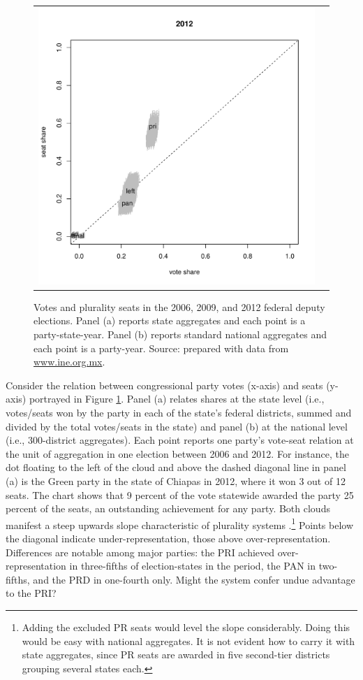 \documentclass[letter,12pt]{article}
\begin{document}
\begin{figure}
\begin{center}
\begin{tabular}{cc}
    \includegraphics[width=.48\columnwidth]{vs2012.pdf} \\
\end{tabular}
\caption{Votes and plurality seats in the 2006, 2009, and 2012 federal deputy elections. Panel (a) reports state aggregates and each point is a party-state-year. Panel (b) reports standard national aggregates and each point is a party-year. Source: prepared with data from \url{www.ine.org.mx}.}\label{F:seatsVotes}
\end{center}
\end{figure}

Consider the relation between congressional party votes (x-axis) and seats (y-axis) portrayed in Figure \ref{F:seatsVotes}. Panel (a) relates shares at the state level (i.e., votes/seats won by the party in each of the state's federal districts, summed and divided by the total votes/seats in the state) and panel (b) at the national level (i.e., 300-district aggregates). Each point reports one party's vote-seat relation at the unit of aggregation in one election between 2006 and 2012. For instance, the dot floating to the left of the cloud and above the dashed diagonal line in panel (a) is the Green party in the state of Chiapas in 2012, where it won 3 out of 12 seats. The chart shows that 9 percent of the vote statewide awarded the party 25 percent of the seats, an outstanding achievement for any party. Both clouds manifest a steep upwards slope characteristic of plurality systems \citep{taagepera.CubeLaw.1973}.\footnote{Adding the excluded PR seats would level the slope considerably. Doing this would be easy with national aggregates. It is not evident how to carry it with state aggregates, since PR seats are awarded in five second-tier districts grouping several states each.} Points below the diagonal indicate under-representation, those above over-representation. Differences are notable among major parties: the PRI achieved over-representation in three-fifths of election-states in the period, the PAN in two-fifths, and the PRD in one-fourth only. Might the system confer undue advantage to the PRI? %
\end{document}
